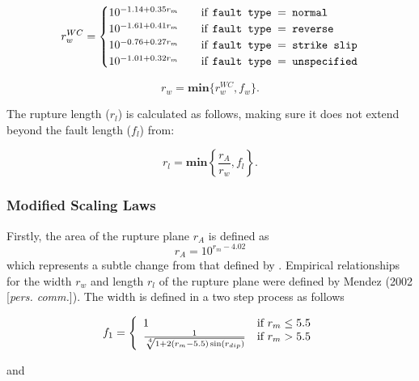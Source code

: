 \begin{equation}\label{rw}
r_w^{WC} = 
\begin{cases}
10^{-1.14 + 0.35r_m}	& \quad \mbox{if \texttt{fault type $=$  normal}} \\
10^{-1.61 + 0.41r_m}	& \quad \mbox{if \texttt{fault type $=$  reverse}} \\
10^{-0.76 + 0.27r_m}	& \quad \mbox{if \texttt{fault type $=$  strike slip}} \\
10^{-1.01 + 0.32r_m}	& \quad \mbox{if \texttt{fault type $=$  unspecified}} \\
\end{cases}
\end{equation}


\begin{equation} \label{eq:rw}
r_w = \mathbf{min}\{r_w^{WC}, f_w\} .
\end{equation}

The rupture length ($r_l$) is calculated as follows, making sure it does not extend beyond the fault length ($f_l$) from:

\begin{equation}
r_l = \mathbf{min}\left\{\frac{r_A}{r_w}, f_l\right\} .
\end{equation}


\subsubsection{Modified \citep{eqrm_Wells94} Scaling Laws}

Firstly, the area of the rupture plane $r_A$ is defined as
\begin{equation}
r_A = 10^{r_m - 4.02}
\end{equation}
which represents a subtle change from that defined by
\citep{eqrm_Wells94}. Empirical relationships for the width $r_w$
and length $r_l$ of the rupture plane were defined by Mendez (2002
[\textit{pers. comm.}]). The width is defined in a two step
process as follows

\begin{equation}
 f_1 = \left \{ \begin{array}{ll}
 1 & \textrm{if $r_m \leq 5.5$} \\
\frac{1}{\sqrt[\leftroot{-2}\uproot{2}4]{1+2(r_m-5.5)\sin(r_{dip})}} & \textrm{if $r_m>5.5$} \\
\end{array} \right.
\end{equation}

and

